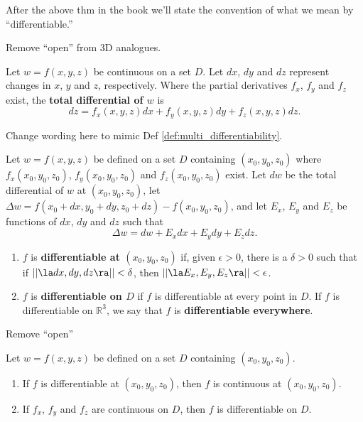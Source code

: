 \documentclass{article}
\begin{document}
After the above thm in the book we'll state the convention of what we mean by ``differentiable.''

Remove ``open'' from 3D analogues.

{Let $w=f(x,y,z)$ be continuous on a set $D$. Let $dx$, $dy$ and $dz$ represent changes in $x$, $y$ and  $z$, respectively. Where the partial derivatives $f_x$, $f_y$ and $f_z$ exist, the \textbf{total differential of $w$} is
$$dz = f_x(x,y,z)dx + f_y(x,y,z)dy+f_z(x,y,z)dz.$$
}

Change wording here to mimic Def \ref{def:multi_differentiability}.

{Let $w=f(x,y,z)$ be defined on a set $D$ containing $(x_0,y_0,z_0)$ where $f_x(x_0,y_0,z_0)$, $f_y(x_0,y_0,z_0)$ and $f_z(x_0,y_0,z_0)$ exist. Let $dw$ be the total differential of $w$ at $(x_0,y_0,z_0)$, let $\Delta w = f(x_0+dx,y_0+dy,z_0+dz) - f(x_0,y_0,z_0)$, and let $E_x$, $E_y$ and $E_z$ be functions of $dx$, $dy$ and $dz$  such that
$$\Delta w = dw + E_xdx + E_ydy + E_zdz.$$
\begin{enumerate}
	\item $f$ is \textbf{differentiable at $(x_0,y_0,z_0)$} if, given $\epsilon >0$, there is a $\delta >0$ such that if $||\la dx,dy,dz\ra|| < \delta$, then $||\la E_x,E_y,E_z\ra|| < \epsilon$. 
	\item	$f$ is \textbf{differentiable on $D$} if $f$ is differentiable at every point in $D$. If $f$ is differentiable on $\mathbb{R}^3$, we say that $f$ is \textbf{differentiable everywhere}.
\end{enumerate}
}

Remove ``open''

{Let $w=f(x,y,z)$ be defined on a set $D$ containing $(x_0,y_0,z_0)$. 
\begin{enumerate}
\item	If $f$ is differentiable at $(x_0,y_0,z_0)$, then $f$ is continuous at $(x_0,y_0,z_0)$.
\item If $f_x$, $f_y$  and $f_z$ are continuous on $D$, then $f$ is differentiable on $D$.
\end{enumerate}
}
\end{document}
